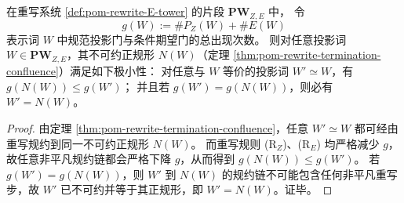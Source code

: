 \begin{corollary}[读出塔正规形的审计门数最小性与唯一极小实现]\label{cor:pom-rewrite-normalform-minimal-audit}
在重写系统 \ref{def:pom-rewrite-E-tower} 的片段 \(\mathbf{PW}_{Z,E}\) 中，
令
\[
g(W):=\#P_Z(W)+\#E(W)
\]
表示词 \(W\) 中规范投影门与条件期望门的总出现次数。
则对任意投影词 \(W\in\mathbf{PW}_{Z,E}\)，其不可约正规形 \(N(W)\)（定理 \ref{thm:pom-rewrite-termination-confluence}）满足如下极小性：
对任意与 \(W\) 等价的投影词 \(W'\simeq W\)，有 \(g(N(W))\le g(W')\)；
并且若 \(g(W')=g(N(W))\)，则必有 \(W'=N(W)\)。
\end{corollary}

\begin{proof}
由定理 \ref{thm:pom-rewrite-termination-confluence}，任意 \(W'\simeq W\) 都可经由重写规约到同一不可约正规形 \(N(W)\)。
而重写规则 (R$_Z$)、(R$_E$) 均严格减少 \(g\)，故任意非平凡规约链都会严格下降 \(g\)，从而得到 \(g(N(W))\le g(W')\)。
若 \(g(W')=g(N(W))\)，则 \(W'\) 到 \(N(W)\) 的规约链不可能包含任何非平凡重写步，故 \(W'\) 已不可约并等于其正规形，即 \(W'=N(W)\)。证毕。
\end{proof}
